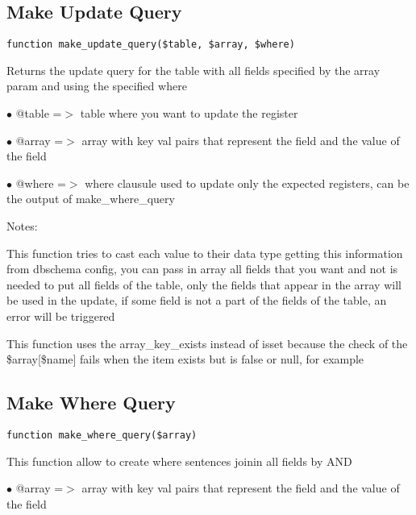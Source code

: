 \documentclass[a4paper]{book}
\begin{document}
\hypertarget{toc244}{}
\subsection{Make Update Query}

\begin{lstlisting}
function make_update_query($table, $array, $where)
\end{lstlisting}

Returns the update query for the table with all fields specified by the
array param and using the specified where

\begin{compactitem}
\item[\color{myblue}$\bullet$] @table =$>$ table where you want to update the register
\item[\color{myblue}$\bullet$] @array =$>$ array with key val pairs that represent the field and the value of
          the field
\item[\color{myblue}$\bullet$] @where =$>$ where clausule used to update only the expected registers, can be
          the output of make\_where\_query
\end{compactitem}

Notes:

This function tries to cast each value to their data type getting this
information from dbschema config, you can pass in array all fields that
you want and not is needed to put all fields of the table, only the
fields that appear in the array will be used in the update, if some
field is not a part of the fields of the table, an error will be
triggered

This function uses the array\_key\_exists instead of isset because the
check of the \$array[\$name] fails when the item exists but is false or
null, for example

\hypertarget{toc245}{}
\subsection{Make Where Query}

\begin{lstlisting}
function make_where_query($array)
\end{lstlisting}

This function allow to create where sentences joinin all fields by AND

\begin{compactitem}
\item[\color{myblue}$\bullet$] @array =$>$ array with key val pairs that represent the field and the value of
          the field
\end{compactitem}
\end{document}
